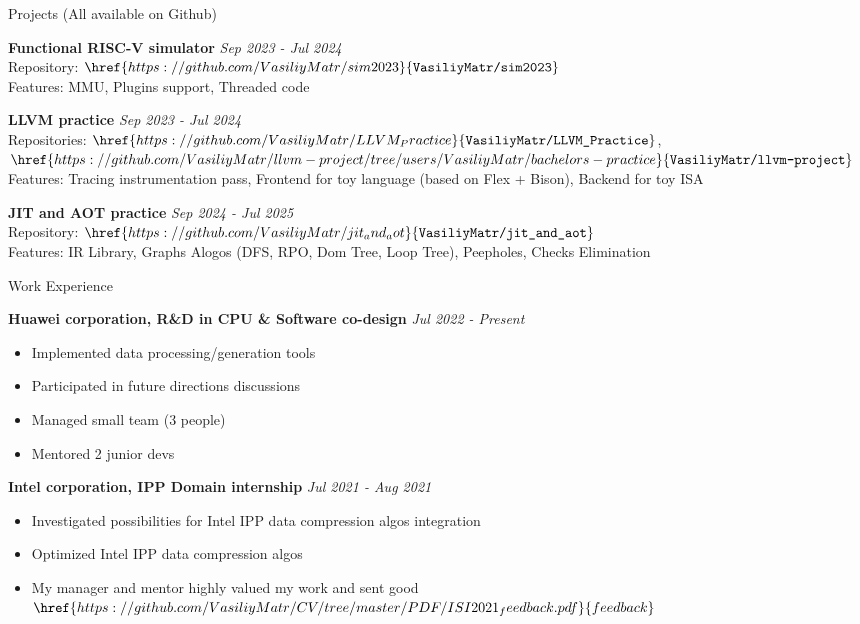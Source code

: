 \documentclass{resume} %
\begin{document}
\begin{rSection}{Projects (All available on Github)}

\textbf{Functional RISC-V simulator} \hfill {\em Sep 2023 - Jul 2024} \\
Repository: $\href{https://github.com/VasiliyMatr/sim2023}{\texttt{VasiliyMatr/sim2023}}$ \\
Features: MMU, Plugins support, Threaded code

\textbf{LLVM practice} \hfill {\em Sep 2023 - Jul 2024} \\
Repositories: $\href{https://github.com/VasiliyMatr/LLVM_Practice}{\texttt{VasiliyMatr/LLVM\_Practice}}$,
    $\href{https://github.com/VasiliyMatr/llvm-project/tree/users/VasiliyMatr/bachelors-practice}{\texttt{VasiliyMatr/llvm-project}}$ \\
Features: Tracing instrumentation pass, Frontend for toy language (based on Flex + Bison), Backend for toy ISA

\textbf{JIT and AOT practice} \hfill {\em Sep 2024 - Jul 2025} \\
Repository: $\href{https://github.com/VasiliyMatr/jit_and_aot}{\texttt{VasiliyMatr/jit\_and\_aot}}$ \\
Features: IR Library, Graphs Alogos (DFS, RPO, Dom Tree, Loop Tree), Peepholes, Checks Elimination \\

\end{rSection}

\begin{rSection}{Work Experience}

\textbf{Huawei corporation, R\&D in CPU \& Software co-design} \hfill {\em Jul 2022 - Present}
\begin{itemize}
\item Implemented data processing/generation tools
\item Participated in future directions discussions
\item Managed small team (3 people)
\item Mentored 2 junior devs
\end{itemize}

\textbf{Intel corporation, IPP Domain internship} \hfill {\em Jul 2021 - Aug 2021}
\begin{itemize}
\item Investigated possibilities for Intel IPP data compression algos integration
\item Optimized Intel IPP data compression algos
\item My manager and mentor highly valued my work and sent good
    $\href{https://github.com/VasiliyMatr/CV/tree/master/PDF/ISI2021_feedback.pdf}{feedback}$
\end{itemize}

\end{rSection}
\end{document}
